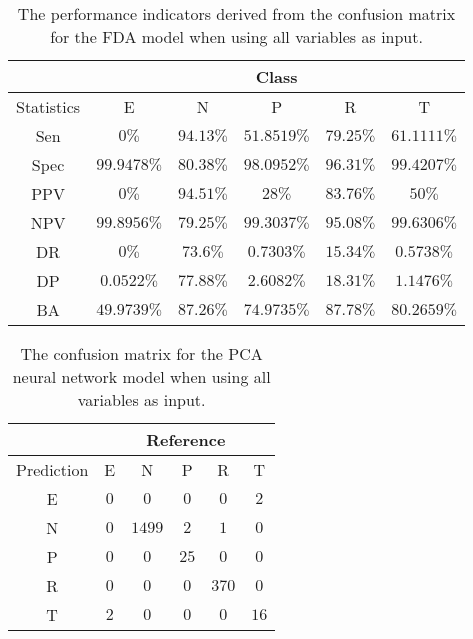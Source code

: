 \begin{table}[!ht]
	\centering
	\begin{tabular}{|c|c|c|c|c|c|}
		\hline
		 & \multicolumn{5}{c|}{Class} \\ \hline
		Statistics & E & N & P & R & T \\ \hline
		Sen & $0\%$ & $94.13\%$ & $51.8519\%$ & $79.25\%$ & $61.1111\%$ \\ \hline
		Spec & $99.9478\%$ & $80.38\%$ & $98.0952\%$ & $96.31\%$ & $99.4207\%$ \\ \hline
		PPV & $0\%$ & $94.51\%$ & $28\%$ & $83.76\%$ & $50\%$ \\ \hline
		NPV & $99.8956\%$ & $79.25\%$ & $99.3037\%$ & $95.08\%$ & $99.6306\%$ \\ \hline
		DR & $0\%$ & $73.6\%$ & $0.7303\%$ & $15.34\%$ & $0.5738\%$ \\ \hline
		DP & $0.0522\%$ & $77.88\%$ & $2.6082\%$ & $18.31\%$ & $1.1476\%$ \\ \hline
		BA & $49.9739\%$ & $87.26\%$ & $74.9735\%$ & $87.78\%$ & $80.2659\%$ \\ \hline
	\end{tabular}
	\caption{The performance indicators derived from the confusion matrix for the FDA model when using all variables as input.}
	\label{tab:cs:reverse:all:fda}
\end{table}

\begin{table}[!ht]
	\centering
	\begin{tabular}{|c|c|c|c|c|c|}
		\hline
		 & \multicolumn{5}{|c|}{Reference} \\ \hline
		 Prediction & E & N & P & R & T \\ \hline
		 E & $0$ & $0$ & $0$ & $0$ & $2$ \\ \hline
		 N & $0$ & $1499$ & $2$ & $1$ & $0$ \\ \hline
		 P & $0$ & $0$ & $25$ & $0$ & $0$ \\ \hline
		 R & $0$ & $0$ & $0$ & $370$ & $0$ \\ \hline
		 T & $2$ & $0$ & $0$ & $0$ & $16$ \\ \hline
	\end{tabular}
	\caption{The confusion matrix for the PCA neural network model when using all variables as input.}
	\label{tab:cm:all:pcaNNet}
\end{table}

